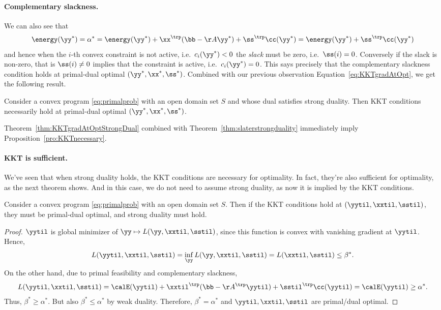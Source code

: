 \paragraph{Complementary slackness.}
We can also see that
\begin{equation*}\energy(\yy^*) =  \alpha^* = \energy(\yy^*) + \xx^{\trp}(\bb - \AA\yy^*) + \ss^{\trp}\cc(\yy^*) = \energy(\yy^*) + \ss^{\trp}\cc(\yy^*) \end{equation*}
and hence when the $i$-th convex constraint is not active, i.e.\ $c_i(\yy^*) < 0$ the \emph{slack} must be zero, i.e.\ $\ss(i) = 0$.
Conversely if the slack is non-zero, that is $\ss(i) \neq 0$ implies
that the constraint is active, i.e.\ $c_i(\yy^*) = 0$.
This says precisely that the complementary slackness condition holds
at primal-dual optimal $(\yy^*, \xx^*, \ss^*)$.
Combined with our previous observation
Equation~\eqref{eq:KKTgradAtOpt}, we get the following result.

\begin{theorem}
  \label{thm:KKTgradAtOptStrongDual}
  Consider a convex program \eqref{eq:primalprob} with an open domain
  set $S$ and whose dual satisfies strong duality.  
Then  KKT conditions necessarily hold at primal-dual
  optimal $(\yy^*, \xx^*, \ss^*)$.
\end{theorem}

Theorem~\ref{thm:KKTgradAtOptStrongDual} combined with
Theorem~\ref{thm:slaterstrongduality} immediately
imply Proposition~\ref{pro:KKTnecessary}.

\paragraph{KKT is sufficient.}
We've seen that when strong duality holds, the KKT conditions are
necessary for optimality. In fact, they're also sufficient for optimality, as the
next theorem shows. And in this case, we do not need to assume
strong duality, as now it is implied by the KKT conditions. 
\begin{theorem}
   Consider a convex program \eqref{eq:primalprob} with an open domain
  set $S$.
   Then if the KKT conditions hold at $(\yytil,\xxtil,\sstil)$, they must be
   primal-dual optimal, and strong duality must hold.
\end{theorem}
\begin{proof}
  $\yytil$ is global minimizer of $\yy \mapsto L(\yy, \xxtil, \sstil)$, since this function is convex with vanishing gradient at $\yytil$. Hence,
  \[ L(\yytil, \xxtil, \sstil) = \inf_{\yy} L(\yy, \xxtil, \sstil) = L(\xxtil,\sstil) \leq \beta^*. \]
  On the other hand, due to primal feasibility and complementary slackness,
  \[ L(\yytil,\xxtil,\sstil) = \calE(\yytil) + \xxtil^\trp(\bb-\AA^\trp\yytil) + \sstil^\trp\cc(\yytil) = \calE(\yytil) \geq \alpha^*. \]
  Thus, $\beta^*\geq\alpha^*$. But also $\beta^*\leq\alpha^*$ by weak duality. Therefore, $\beta^*=\alpha^*$ and $\yytil,\xxtil,\sstil$ are primal/dual optimal.
\end{proof}


